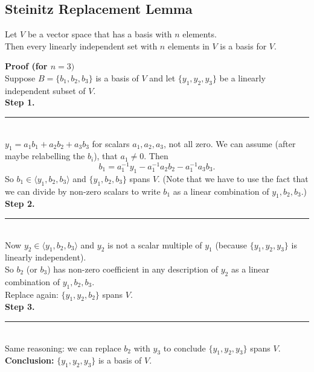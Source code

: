 \documentclass[a4paper, 9pt]{extarticle}
\begin{document}
\subsection{Steinitz Replacement Lemma}
\begin{lemmabox}{}{}
  Let $V$ be a vector space that has a basis with $n$ elements. \\[2ex]
  Then every linearly independent set with $n$ elements in $V$ is a basis for $V$.
\end{lemmabox}
\noindent \textbf{Proof (for $n = 3)$} \\
Suppose $B = \{b_1, b_2, b_3\}$ is a basis of $V$ and let $\{y_1, y_2, y_3\}$ be a linearly independent subset of $V$. \\[2ex]
\textbf{Step 1.} \rule[.25\baselineskip]{\textwidth}{0.5px}\\
$y_1 = a_1 b_1 + a_2 b_2 + a_3 b_3$ for scalars $a_1, a_2, a_3$, not all zero.
We can assume (after maybe relabelling the $b_i$), that $a_1 \ne 0$.
Then
$$
  b_1 = a_1^{-1} y_1 - a_1^{-1} a_2 b_2 - a_1^{-1} a_3 b_3.
$$
So $b_1 \in \langle y_1, b_2, b_3 \rangle$ and $\{y_1, b_2, b_3\}$ spans $V$.
(Note that we have to use the fact that we can divide by non-zero scalars to write $b_1$ as a linear combination of $y_1, b_2, b_3$.) \\[2ex]
\textbf{Step 2.} \rule[.25\baselineskip]{\textwidth}{0.5px}\\
Now $y_2 \in \langle y_1, b_2, b_3 \rangle$ and $y_2$ is not a scalar multiple of $y_1$ (because $\{y_1, y_2, y_3\}$ is linearly independent). \\
So $b_2$ (or $b_3$) has non-zero coefficient in any description of $y_2$ as a linear combination of $y_1, b_2, b_3$. \\
Replace again: $\{y_1, y_2, b_2\}$ spans $V$. \\[2ex]
\textbf{Step 3.} \rule[.25\baselineskip]{\textwidth}{0.5px}\\
Same reasoning: we can replace $b_2$ with $y_3$ to conclude $\{y_1, y_2, y_3\}$ spans $V$. \\[2ex]
\textbf{Conclusion:} $\{y_1, y_2, y_3\}$ is a basis of $V$.
\pagebreak
\end{document}

